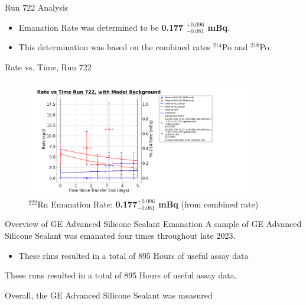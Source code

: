 \documentclass[aspectratio=169]{beamer}
\begin{document}
\begin{frame}{Run 722 Analysis}
    \begin{itemize}
        \item Emanation Rate was determined to be \textbf{0.177 $^{+0.096}_{-0.081}$ mBq}.
        \item This determination was based on the combined rates $^{214}$Po and $^{218}$Po.
    \end{itemize}

    \hyperlink{722_Backup}{}
\end{frame}

\begin{frame}{Rate vs. Time, Run 722}
\label{RvT_722}
    \begin{figure}
        \begin{center}
            \includegraphics[width=0.9\textwidth]
            {assets/722/RvT.png}
            \caption{$^{222}$Rn Emanation Rate: 
            \textbf{0.177$^{+0.096}_{-0.081}$ mBq} (from combined rate)}
        \end{center}
    \end{figure}    
\end{frame}

\begin{frame}{Overview of GE Advanced Silicone Sealant Emanation}
    A sample of GE Advanced Silicone Sealant was emanated four times throughout late 2023.
    \begin{itemize}
        \item These rhns resulted in a total of 895 Hours of useful assay data
    \end{itemize}
    These runs resulted in a total of 895 Hours of useful assay data.
   
    Overall, the GE Advanced Silicone Sealant was measured

\end{frame}
\end{document}
